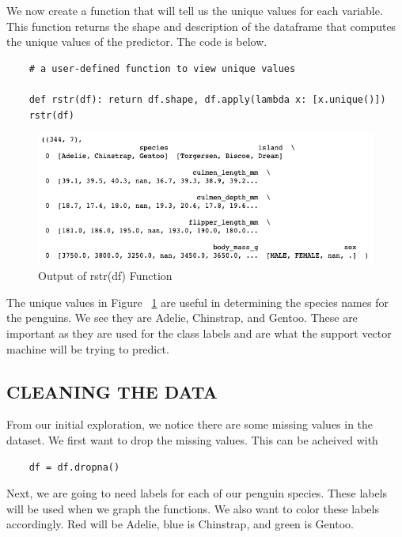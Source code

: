 \documentclass[12pt]{article}
\begin{document}
We now create a function that will tell us the unique values for each variable. This function returns the shape and description of the dataframe that computes the unique values of the predictor. The code is below.

\begin{verbatim}
    # a user-defined function to view unique values

    def rstr(df): return df.shape, df.apply(lambda x: [x.unique()])
    rstr(df)
\end{verbatim}

\begin{figure}[H]
    \centering
    \includegraphics[width=5in]{Figures/penguins/rstr(df).png}
    \caption{Output of rstr(df) Function}
    \label{fig_rstr(df)}
\end{figure}

The unique values in Figure ~\ref{fig_rstr(df)} are useful in determining the species names for the penguins. We see they are Adelie, Chinstrap, and Gentoo. These are important as they are used for the class labels and are what the support vector machine will be trying to predict.

\subsection{CLEANING THE DATA}

From our initial exploration, we notice there are some missing values in the dataset. We first want to drop the missing values. This can be acheived with

\begin{verbatim}
    df = df.dropna()
\end{verbatim}

Next, we are going to need labels for each of our penguin species. These labels will be used when we graph the functions. We also want to color these labels accordingly. Red will be Adelie, blue is Chinstrap, and green is Gentoo.
\end{document}
